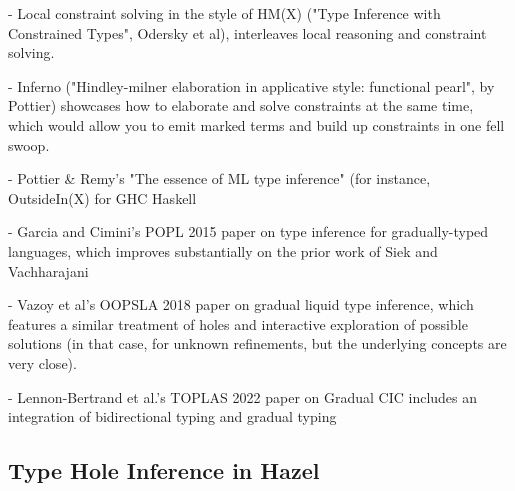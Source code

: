
- Local constraint solving in the style of HM(X) ("Type Inference with Constrained Types", Odersky et al), interleaves local reasoning and constraint solving.

- Inferno ("Hindley-milner elaboration in applicative style: functional pearl", by Pottier) showcases how to elaborate and solve constraints at the same time, which would allow you to emit marked terms and build up constraints in one fell swoop.

- Pottier \& Remy's "The essence of ML type inference" (for instance, OutsideIn(X) for GHC Haskell

- Garcia and Cimini's POPL 2015 paper on type inference for gradually-typed languages, which improves substantially on the prior work of Siek and Vachharajani

- Vazoy et al's OOPSLA 2018 paper on gradual liquid type inference, which features a similar treatment of holes and interactive exploration of possible solutions (in that case, for unknown refinements, but the underlying concepts are very close). 

- Lennon-Bertrand et al.'s TOPLAS 2022 paper on Gradual CIC includes an integration of bidirectional typing and gradual typing



\subsection{Type Hole Inference in Hazel}



